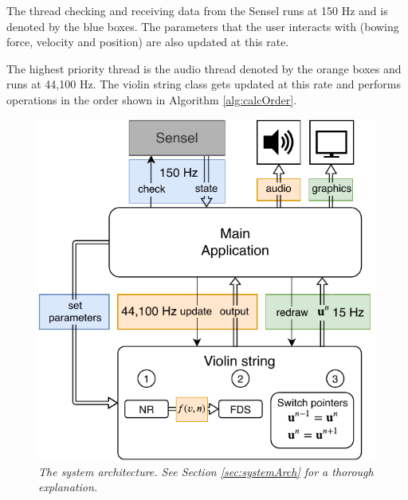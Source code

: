 \documentclass[twoside,a4paper,dvipsnames]{article}
\begin{document}
The thread checking and receiving data from the Sensel runs at 150 Hz and is denoted by the blue boxes. The parameters that the user interacts with (bowing force, velocity and position) are also updated at this rate.

The highest priority thread is the audio thread denoted by the orange boxes and runs at 44,100 Hz. The violin string class gets updated at this rate and performs operations in the order shown in Algorithm \ref{alg:calcOrder}.

\begin{figure}[ht]
\centerline{\includegraphics[width=1.0\columnwidth]{systemArchitecture.pdf}}
\caption{\label{fig:systemArch}{\it The system architecture. See Section \ref{sec:systemArch} for a thorough explanation.}}
\end{figure}
\end{document}
